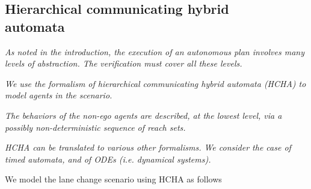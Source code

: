 \subsection{Hierarchical communicating hybrid \\automata}
\label{HCHA}
{\it As noted in the introduction, the execution of an autonomous plan involves many levels of abstraction. The verification must cover all these levels.}

{\it We use the formalism of hierarchical communicating hybrid automata (HCHA) to model agents in the scenario. }
%
%

{\it The behaviors of the non-ego agents are described, at the lowest level, via a possibly non-deterministic sequence of reach sets.}

{\it HCHA can be translated to various other formalisms. We consider the case of timed automata, and of ODEs (i.e. dynamical systems).}

\begin{exmp}
	We model the lane change scenario using HCHA as follows
	\end{exmp}
